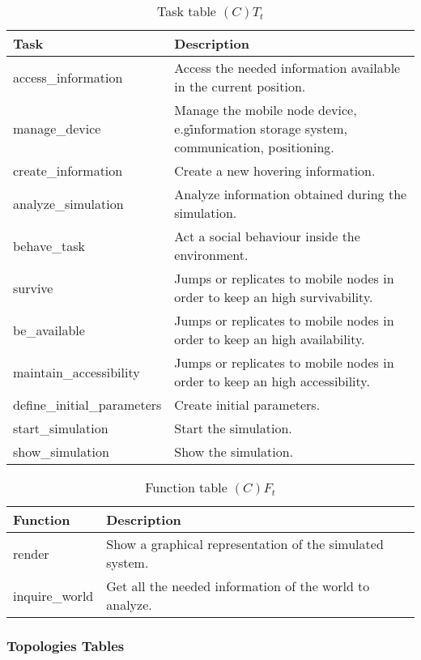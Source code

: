 \begin{table}[H]
	\centering
	\begin{tabular}{|p{5cm}|p{7cm}|}
			\hline
			\textbf{Task} & \textbf{Description} \\
			\hline
			access\_information & Access the needed information available in the
			current position.\\
			\hline
			manage\_device & Manage the mobile node device, e.g\. information storage
			system, communication, positioning. \\
			\hline
			create\_information & Create a new hovering information. \\
			\hline
			analyze\_simulation & Analyze information obtained during the
			simulation.\\
			\hline
			behave\_task & Act a social behaviour inside the environment. \\
			\hline
			survive & Jumps or replicates to mobile nodes in order to keep an high
			survivability. \\
			\hline
			be\_available & Jumps or replicates to mobile nodes in order to keep an
			high availability. \\
			\hline
			maintain\_accessibility & Jumps or replicates to mobile nodes in order to
			keep an high accessibility. \\
			\hline
			define\_initial\_parameters & Create initial parameters. \\
			\hline
			start\_simulation & Start the simulation. \\
			\hline
			show\_simulation & Show the simulation. \\
			\hline
		\end{tabular}
	\caption{Task table $(C)T_t$}
	\label{tab:ctt}
\end{table}

\begin{table}[H]
	\centering
	\begin{tabular}{|p{5cm}|p{7cm}|}
			\hline
			\textbf{Function} & \textbf{Description} \\
			\hline
			render & Show a graphical representation of the simulated system. \\
			\hline
			inquire\_world & Get all the needed information of the world to analyze.
			\\
		\end{tabular}
	\caption{Function table $(C)F_t$}
	\label{tab:cft}
\end{table}

\subsubsection{Topologies Tables}

